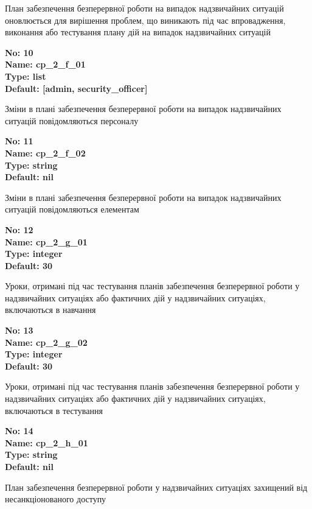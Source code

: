 \documentclass{article}
\begin{document}
{\footnotesize План забезпечення безперервної роботи на випадок надзвичайних ситуацій оновлюється для вирішення проблем, що виникають під час впровадження, виконання або тестування плану дій на випадок надзвичайних ситуацій}


{\footnotesize\bfseries
No: 10\\
Name: cp\_\allowbreak{}2\_\allowbreak{}f\_\allowbreak{}01\\
Type: list\\
Default: [\textquotedbl{}admin\textquotedbl{}, \textquotedbl{}security\_\allowbreak{}officer\textquotedbl{}]
}

{\footnotesize Зміни в плані забезпечення безперервної роботи на випадок надзвичайних ситуацій повідомляються персоналу}


{\footnotesize\bfseries
No: 11\\
Name: cp\_\allowbreak{}2\_\allowbreak{}f\_\allowbreak{}02\\
Type: string\\
Default: nil
}

{\footnotesize Зміни в плані забезпечення безперервної роботи на випадок надзвичайних ситуацій повідомляються елементам}


{\footnotesize\bfseries
No: 12\\
Name: cp\_\allowbreak{}2\_\allowbreak{}g\_\allowbreak{}01\\
Type: integer\\
Default: 30
}

{\footnotesize Уроки, отримані під час тестування планів забезпечення безперервної роботи у надзвичайних ситуаціях або фактичних дій у надзвичайних ситуаціях, включаються в навчання}


{\footnotesize\bfseries
No: 13\\
Name: cp\_\allowbreak{}2\_\allowbreak{}g\_\allowbreak{}02\\
Type: integer\\
Default: 30
}

{\footnotesize Уроки, отримані під час тестування планів забезпечення безперервної роботи у надзвичайних ситуаціях або фактичних дій у надзвичайних ситуаціях, включаються в тестування}


{\footnotesize\bfseries
No: 14\\
Name: cp\_\allowbreak{}2\_\allowbreak{}h\_\allowbreak{}01\\
Type: string\\
Default: nil
}

{\footnotesize План забезпечення безперервної роботи у надзвичайних ситуаціях захищений від несанкціонованого доступу}
\end{document}
